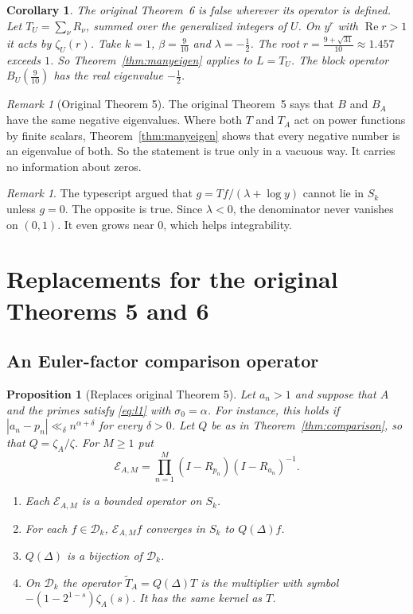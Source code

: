 \documentclass[12pt,letterpaper]{article}
\newtheorem{proposition}[theorem]{Proposition}
\newtheorem{corollary}[theorem]{Corollary}
\theoremstyle{definition}
\theoremstyle{remark}
\newtheorem{remark}[theorem]{Remark}
\newcommand{\Ree}{\operatorname{Re}}
\newcommand{\Dk}{\mathcal{D}_k}
\begin{document}
\begin{corollary}\label{cor:thm6false}
The original Theorem~6 is false wherever its operator is defined. Let
$T_U=\sum_\nu R_\nu$, summed over the generalized integers of $U$. On
$y^r$ with $\Ree r>1$ it acts by $\zeta_U(r)$. Take $k=1$,
$\beta=\frac{9}{10}$ and $\lambda=-\frac12$. The root
$r=\frac{9+\sqrt{31}}{10}\approx1.457$ exceeds $1$. So
Theorem~\ref{thm:manyeigen} applies to $L=T_U$. The block operator
$B_U(\frac{9}{10})$ has the real eigenvalue $-\frac12$.
\end{corollary}

\begin{remark}[Original Theorem 5]\label{rem:thm5}
The original Theorem~5 says that $B$ and $B_A$ have the same negative
eigenvalues. Where both $T$ and $T_A$ act on power functions by finite
scalars, Theorem~\ref{thm:manyeigen} shows that every negative number is
an eigenvalue of both. So the statement is true only in a vacuous way. It
carries no information about zeros.
\end{remark}

\begin{remark}
The typescript argued that $g=Tf/(\lambda+\log y)$ cannot lie in $S_k$
unless $g=0$. The opposite is true. Since $\lambda<0$, the denominator
never vanishes on $(0,1)$. It even grows near $0$, which helps
integrability.
\end{remark}

\section{Replacements for the original Theorems 5 and 6}\label{sec:replace}

\subsection{An Euler-factor comparison operator}

\begin{proposition}[Replaces original Theorem 5]\label{prop:EA}
Let $a_n>1$ and suppose that $A$ and the primes satisfy \eqref{eq:l1} with
$\sigma_0=\alpha$. For instance, this holds if $|a_n-p_n|\ll_\delta
n^{\alpha+\delta}$ for every $\delta>0$. Let $Q$ be as in
Theorem~\ref{thm:comparison}, so that $Q=\zeta_A/\zeta$. For $M\ge1$ put
\[
\mathcal E_{A,M}=\prod_{n=1}^M(I-R_{p_n})(I-R_{a_n})^{-1}.
\]
\begin{enumerate}[label=(\roman*)]
\item Each $\mathcal E_{A,M}$ is a bounded operator on $S_k$.
\item For each $f\in\Dk$, $\mathcal E_{A,M}f$ converges in $S_k$ to
  $Q(\Delta)f$.
\item $Q(\Delta)$ is a bijection of $\Dk$.
\item On $\Dk$ the operator $\widetilde T_A=Q(\Delta)T$ is the multiplier
  with symbol $-(1-2^{1-s})\zeta_A(s)$. It has the same kernel as $T$.
\end{enumerate}
\end{proposition}
\end{document}
